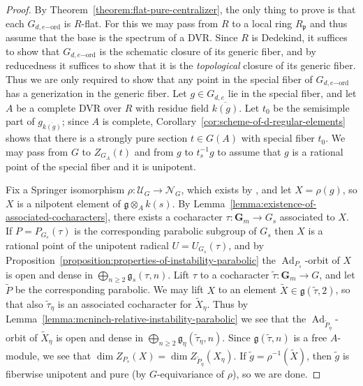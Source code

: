 \documentclass[11pt,reqno]{amsart}
\theoremstyle{definition}
\renewcommand{\rm}{\mathrm}
\newcommand{\bG}{{\mathbf G}}
\newcommand{\sN}{{\mathscr N}}
\newcommand{\sU}{{\mathscr U}}
\newcommand{\fg}{\mathfrak{g}}
\newcommand{\fp}{\mathfrak{p}}
\DeclareMathOperator{\Ad}{Ad}
\begin{document}
\begin{proof}
By Theorem~\ref{theorem:flat-pure-centralizer}, the only thing to prove is that each $G_{d, e\rm{-ord}}$ is $R$-flat. For this we may pass from $R$ to a local ring $R_{\fp}$ and thus assume that the base is the spectrum of a DVR. Since $R$ is Dedekind, it suffices to show that $G_{d, e\rm{-ord}}$ is the schematic closure of its generic fiber, and by reducedness it suffices to show that it is the \textit{topological} closure of its generic fiber. Thus we are only required to show that any point in the special fiber of $G_{d, e\rm{-ord}}$ has a generization in the generic fiber. Let $g \in G_{d, e}$ lie in the special fiber, and let $A$ be a complete DVR over $R$ with residue field $\overline{k(g)}$. Let $t_0$ be the semisimple part of $g_{\overline{k(g)}}$; since $A$ is complete, Corollary~\ref{cor:scheme-of-d-regular-elements} shows that there is a strongly pure section $t \in G(A)$ with special fiber $t_0$. We may pass from $G$ to $Z_{G_A}(t)$ and from $g$ to $t_s^{-1}g$ to assume that $g$ is a rational point of the special fiber and it is unipotent. \smallskip

Fix a Springer isomorphism $\rho: \sU_G \to \sN_G$, which exists by \cite[Thm.\ 5.1]{Integral-Springer}, and let $X = \rho(g)$, so $X$ is a nilpotent element of $\fg \otimes_A k(s)$. By Lemma~\ref{lemma:existence-of-associated-cocharacters}, there exists a cocharacter $\tau: \bG_m \to G_s$ associated to $X$. If $P = P_{G_s}(\tau)$ is the corresponding parabolic subgroup of $G_s$ then $X$ is a rational point of the unipotent radical $U = U_{G_s}(\tau)$, and by Proposition~\ref{proposition:properties-of-instability-parabolic} the $\Ad_{P_s}$-orbit of $X$ is open and dense in $\bigoplus_{n \geq 2} \fg_s(\tau, n)$. Lift $\tau$ to a cocharacter $\widetilde{\tau}: \bG_m \to G$, and let $\widetilde{P}$ be the corresponding parabolic. We may lift $X$ to an element $\widetilde{X} \in \fg(\widetilde{\tau}, 2)$, so that also $\widetilde{\tau}_\eta$ is an associated cocharacter for $\widetilde{X}_\eta$. Thus by Lemma~\ref{lemma:mcninch-relative-instability-parabolic} we see that the $\Ad_{\widetilde{P}_{\eta}}$-orbit of $\widetilde{X}_{\eta}$ is open and dense in $\bigoplus_{n \geq 2} \fg_\eta(\widetilde{\tau}_\eta, n)$. Since $\fg(\widetilde{\tau}, n)$ is a free $A$-module, we see that $\dim Z_{P_s}(X) = \dim Z_{\widetilde{P}_\eta}(X_\eta)$. If $\widetilde{g} = \rho^{-1}(\widetilde{X})$, then $\widetilde{g}$ is fiberwise unipotent and pure (by $G$-equivariance of $\rho$), so we are done.
\end{proof}
\end{document}
